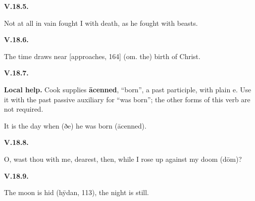 \par\begin{minipage}{\linewidth}\raggedright
\textbf{V.18.5.}

Not at all in vain fought I with death, as he fought with beasts.

\end{minipage}\par\addvspace{4pt}

\par\begin{minipage}{\linewidth}\raggedright
\textbf{V.18.6.}

The time draws near [approaches, 164] (om. the) birth of Christ.

\end{minipage}\par\addvspace{4pt}

\par\begin{minipage}{\linewidth}\raggedright
\textbf{V.18.7.}

\textbf{Local help.} Cook supplies \textbf{ācenned}, “born”, a past participle, with plain e. Use it with the past passive auxiliary for “was born”; the other forms of this verb are not required.

It is the day when (ðe) he was born (ācenned).

\end{minipage}\par\addvspace{4pt}

\par\begin{minipage}{\linewidth}\raggedright
\textbf{V.18.8.}

O, wast thou with me, dearest, then, while I rose up against my doom (dōm)?

\end{minipage}\par\addvspace{4pt}

\par\begin{minipage}{\linewidth}\raggedright
\textbf{V.18.9.}

The moon is hid (hȳdan, 113), the night is still.

\end{minipage}\par\addvspace{4pt}

